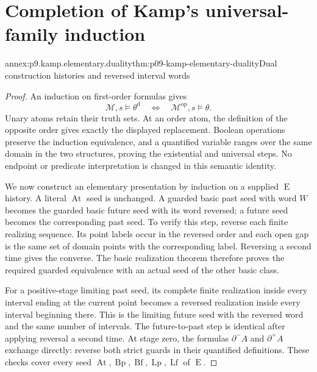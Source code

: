 
\section{Completion of Kamp's universal-family induction}
\label{sec:annex-p09-kamp-iii2-lemma8-completion}

\begin{annexitem}{annex:p9.kamp.elementary.duality}{thm:p09-kamp-elementary-duality}{Dual construction histories and reversed interval words}
\begin{proof}
An induction on first-order formulas gives
\[
 \mathcal M,s\models\theta^{\mathrm d}
       \quad\Longleftrightarrow\quad
 \mathcal M^{\mathrm{op}},s\models\theta.
 \tag{1}
\]
Unary atoms retain their truth sets. At an order atom, the definition
of the opposite order gives exactly the displayed replacement.
Boolean operations preserve the induction equivalence, and a quantified
variable ranges over the same domain in the two structures, proving
the existential and universal steps. No endpoint or predicate interpretation
is changed in this semantic identity.

We now construct an elementary presentation by induction on a supplied
\(\operatorname{E}\) history. A literal \(\operatorname{At}\)
seed is unchanged. A guarded basic past seed with word \(W\)
becomes the guarded basic future seed with its word reversed; a future
seed becomes the corresponding past seed. To verify this step, reverse
each finite realizing sequence. Its point labels occur in the reversed
order and each open gap is the same set of domain points with the
corresponding label. Reversing a second time gives the converse.
The basic realization theorem therefore proves the required guarded
equivalence with an actual seed of the other basic class.

For a positive-stage limiting past seed, its complete finite realization
inside every interval ending at the current point becomes a reversed
realization inside every interval beginning there. This is the limiting
future seed with the reversed word and the same number of intervals.
The future-to-past step is identical after applying reversal a second
time. At stage zero, the formulas \(\partial^-A\) and
\(\partial^+A\) exchange directly: reverse both strict guards
in their quantified definitions. These checks cover every seed
\(\operatorname{At},\operatorname{Bp},\operatorname{Bf},
\operatorname{Lp},\operatorname{Lf}\) of \(\operatorname{E}\).


\end{proof}
\end{annexitem}
